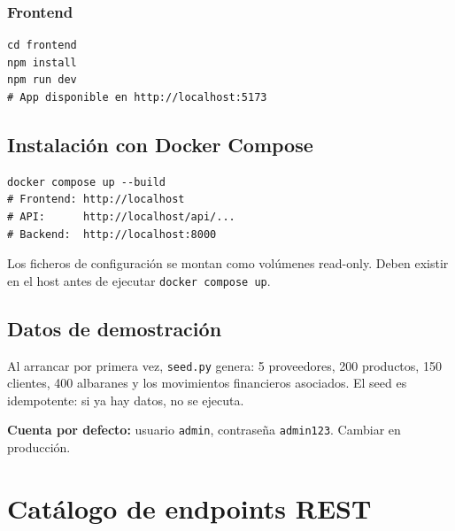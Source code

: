 \documentclass[12pt,twoside,titlepage]{report}
\begin{document}
\subsection{Frontend}

\begin{verbatim}
cd frontend
npm install
npm run dev
# App disponible en http://localhost:5173
\end{verbatim}

\section{Instalación con Docker Compose}

\begin{verbatim}
docker compose up --build
# Frontend: http://localhost
# API:      http://localhost/api/...
# Backend:  http://localhost:8000
\end{verbatim}

Los ficheros de configuración se montan como volúmenes read-only. Deben existir en el host antes de ejecutar \texttt{docker compose up}.

\section{Datos de demostración}

Al arrancar por primera vez, \texttt{seed.py} genera: 5 proveedores, 200 productos, 150 clientes, 400 albaranes y los movimientos financieros asociados. El seed es idempotente: si ya hay datos, no se ejecuta.

\textbf{Cuenta por defecto:} usuario \texttt{admin}, contraseña \texttt{admin123}. Cambiar en producción.


\chapter{Catálogo de endpoints REST}
\label{apx:endpoints}
\end{document}
